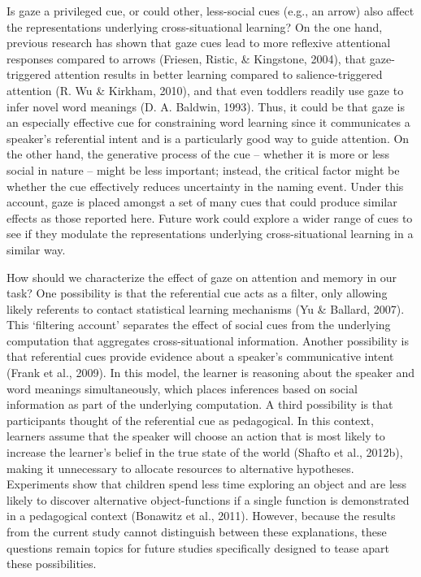\documentclass[oneside]{report}
\begin{document}
Is gaze a privileged cue, or could other, less-social cues (e.g., an
arrow) also affect the representations underlying cross-situational
learning? On the one hand, previous research has shown that gaze cues
lead to more reflexive attentional responses compared to arrows
(Friesen, Ristic, \& Kingstone, 2004), that gaze-triggered attention
results in better learning compared to salience-triggered attention (R.
Wu \& Kirkham, 2010), and that even toddlers readily use gaze to infer
novel word meanings (D. A. Baldwin, 1993). Thus, it could be that gaze
is an especially effective cue for constraining word learning since it
communicates a speaker's referential intent and is a particularly good
way to guide attention. On the other hand, the generative process of the
cue -- whether it is more or less social in nature -- might be less
important; instead, the critical factor might be whether the cue
effectively reduces uncertainty in the naming event. Under this account,
gaze is placed amongst a set of many cues that could produce similar
effects as those reported here. Future work could explore a wider range
of cues to see if they modulate the representations underlying
cross-situational learning in a similar way.

How should we characterize the effect of gaze on attention and memory in
our task? One possibility is that the referential cue acts as a filter,
only allowing likely referents to contact statistical learning
mechanisms (Yu \& Ballard, 2007). This `filtering account' separates the
effect of social cues from the underlying computation that aggregates
cross-situational information. Another possibility is that referential
cues provide evidence about a speaker's communicative intent (Frank et
al., 2009). In this model, the learner is reasoning about the speaker
and word meanings simultaneously, which places inferences based on
social information as part of the underlying computation. A third
possibility is that participants thought of the referential cue as
pedagogical. In this context, learners assume that the speaker will
choose an action that is most likely to increase the learner's belief in
the true state of the world (Shafto et al., 2012b), making it
unnecessary to allocate resources to alternative hypotheses. Experiments
show that children spend less time exploring an object and are less
likely to discover alternative object-functions if a single function is
demonstrated in a pedagogical context (Bonawitz et al., 2011). However,
because the results from the current study cannot distinguish between
these explanations, these questions remain topics for future studies
specifically designed to tease apart these possibilities.
\end{document}
